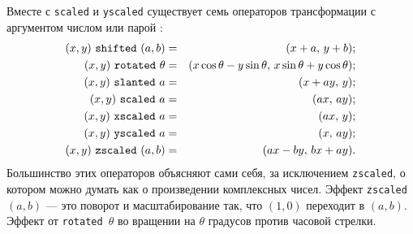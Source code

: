 \documentclass{article} %
\begin{document}
Вместе с {\tt scaled} и {\tt yscaled} существует семь операторов 
трансформации с аргументом числом или парой :%
%
\label{Dtranop}
\begin{eqnarray*}
 (x,y){\tt\ shifted\ }(a,b)     &=& (x+a,\, y+b); \\
 (x,y){\tt\ rotated\ }\theta    &=& (x\cos\theta-y\sin\theta,\,
                                        x\sin\theta+y\cos\theta); \\
 (x,y){\tt\ slanted\ }a         &=& (x+ay,\, y); \\
 (x,y){\tt\ scaled\ }a          &=& (ax,\, ay); \\
 (x,y){\tt\ xscaled\ }a         &=& (ax,\, y); \\
 (x,y){\tt\ yscaled\ }a         &=& (x,\, ay); \\
 (x,y){\tt\ zscaled\ }(a,b)     &=& (ax-by,\, bx+ay).
\end{eqnarray*}
Большинство этих операторов объясняют сами себя, за исключением 
{\tt zscaled}, о котором можно думать как о произведении комплексных чисел.
Эффект {\tt zscaled} $(a,b)$ --- это поворот и масштабирование так, что 
$(1,0)$ переходит в $(a,b)$. 
Эффект от {\tt rotated}~$\theta$ во вращении на $\theta$ градусов против 
часовой стрелки. 
\end{document}
